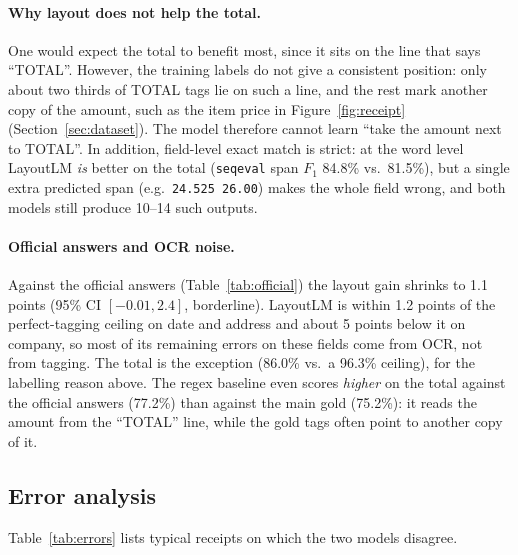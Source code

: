 \paragraph{Why layout does not help the total.} One would expect the
total to benefit most, since it sits on the line that says ``TOTAL''.
However, the training labels do not give a consistent position: only
about two thirds of TOTAL tags lie on such a line, and the rest mark
another copy of the amount, such as the item price in
Figure~\ref{fig:receipt} (Section~\ref{sec:dataset}). The model
therefore cannot learn ``take the amount next to TOTAL''. In addition,
field-level exact match is strict: at the word level LayoutLM \emph{is}
better on the total (\texttt{seqeval} span $F_1$ 84.8\% vs.\ 81.5\%),
but a single extra predicted span (e.g.\ \texttt{24.525 26.00}) makes
the whole field wrong, and both models still produce 10--14 such
outputs.

\paragraph{Official answers and OCR noise.} Against the official answers
(Table~\ref{tab:official}) the layout gain shrinks to 1.1 points (95\%
CI $[-0.01, 2.4]$, borderline). LayoutLM is within 1.2 points of the
perfect-tagging ceiling on date and address and about 5 points below it
on company, so most of its remaining errors on these fields come from
OCR, not from tagging. The total is the exception (86.0\% vs.\ a 96.3\%
ceiling), for the labelling reason above. The regex baseline even scores
\emph{higher} on the total against the official answers (77.2\%) than
against the main gold (75.2\%): it reads the amount from the ``TOTAL''
line, while the gold tags often point to another copy of it.

\subsection{Error analysis}

Table~\ref{tab:errors} lists typical receipts on which the two models
disagree.

